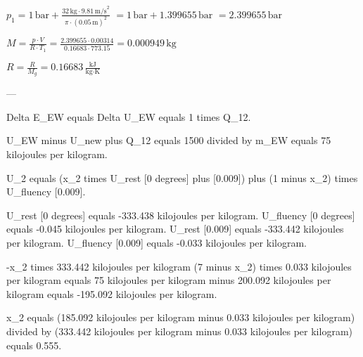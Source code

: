 \( p_1 = 1 \, \text{bar} + \frac{32 \, \text{kg} \cdot 9.81 \, \text{m/s}^2}{\pi \cdot (0.05 \, \text{m})^2} \)  
\( = 1 \, \text{bar} + 1.399655 \, \text{bar} \)  
\( = 2.399655 \, \text{bar} \)  

\( M = \frac{p \cdot V}{R \cdot T_1} = \frac{2.399655 \cdot 0.00314}{0.16683 \cdot 773.15} = 0.000949 \, \text{kg} \)  

\( R = \frac{R}{M_g} = 0.16683 \, \frac{\text{kJ}}{\text{kg·K}} \)  

---

Delta E_EW equals Delta U_EW equals 1 times Q_12.  

U_EW minus U_new plus Q_12 equals 1500 divided by m_EW equals 75 kilojoules per kilogram.  

U_2 equals (x_2 times U_rest [0 degrees] plus [0.009]) plus (1 minus x_2) times U_fluency [0.009].  

U_rest [0 degrees] equals -333.438 kilojoules per kilogram.  
U_fluency [0 degrees] equals -0.045 kilojoules per kilogram.  
U_rest [0.009] equals -333.442 kilojoules per kilogram.  
U_fluency [0.009] equals -0.033 kilojoules per kilogram.  

-x_2 times 333.442 kilojoules per kilogram (7 minus x_2) times 0.033 kilojoules per kilogram equals 75 kilojoules per kilogram minus 200.092 kilojoules per kilogram equals -195.092 kilojoules per kilogram.  

x_2 equals (185.092 kilojoules per kilogram minus 0.033 kilojoules per kilogram) divided by (333.442 kilojoules per kilogram minus 0.033 kilojoules per kilogram) equals 0.555.